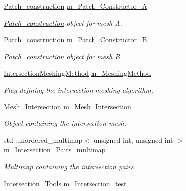 \begin{DoxyCompactItemize}
\hyperlink{classcarl_1_1_patch__construction}{Patch\+\_\+construction} \hyperlink{classcarl_1_1_intersection___search_a3bc66e4e9a0b41d9b20093d4f6ca7611}{m\+\_\+\+Patch\+\_\+\+Constructor\+\_\+\+A}
\begin{DoxyCompactList}\small\item\em \hyperlink{classcarl_1_1_patch__construction}{Patch\+\_\+construction} object for mesh A. \end{DoxyCompactList}\item 
\hyperlink{classcarl_1_1_patch__construction}{Patch\+\_\+construction} \hyperlink{classcarl_1_1_intersection___search_a2e2b5a2784eeca7b558b6b93ae71a2e8}{m\+\_\+\+Patch\+\_\+\+Constructor\+\_\+\+B}
\begin{DoxyCompactList}\small\item\em \hyperlink{classcarl_1_1_patch__construction}{Patch\+\_\+construction} object for mesh B. \end{DoxyCompactList}\item 
\hyperlink{namespacecarl_a4f72fd25137b97ac1ca1276ec549e5cf}{Intersection\+Meshing\+Method} \hyperlink{classcarl_1_1_intersection___search_afc8983d95c970eaa61c6f4ae50a22f4b}{m\+\_\+\+Meshing\+Method}
\begin{DoxyCompactList}\small\item\em Flag defining the intersection meshing algorithm. \end{DoxyCompactList}\item 
\hyperlink{classcarl_1_1_mesh___intersection}{Mesh\+\_\+\+Intersection} \hyperlink{classcarl_1_1_intersection___search_a4946b764d66e3f26f323c5d043551c66}{m\+\_\+\+Mesh\+\_\+\+Intersection}
\begin{DoxyCompactList}\small\item\em Object containing the intersection mesh. \end{DoxyCompactList}\item 
std\+::unordered\+\_\+multimap$<$ unsigned int, unsigned int $>$ \hyperlink{classcarl_1_1_intersection___search_a21bb47bfa3021d18b718919ad4a245d7}{m\+\_\+\+Intersection\+\_\+\+Pairs\+\_\+multimap}
\begin{DoxyCompactList}\small\item\em Multimap containing the intersection pairs. \end{DoxyCompactList}\item 
\hyperlink{classcarl_1_1_intersection___tools}{Intersection\+\_\+\+Tools} \hyperlink{classcarl_1_1_intersection___search_afeedb5ff9144638151b7f956cf113fc4}{m\+\_\+\+Intersection\+\_\+test}

\end{DoxyCompactItemize}
